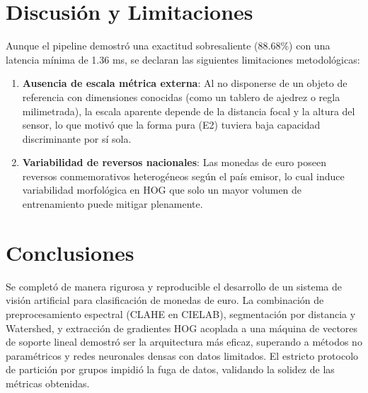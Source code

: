 \documentclass[journal,compsoc,twoside]{IEEEtran}
\begin{document}
\section{Discusión y Limitaciones}
Aunque el pipeline demostró una exactitud sobresaliente (88.68\%) con una latencia mínima de 1.36 ms, se declaran las siguientes limitaciones metodológicas:
\begin{enumerate}
    \item \textbf{Ausencia de escala métrica externa}: Al no disponerse de un objeto de referencia con dimensiones conocidas (como un tablero de ajedrez o regla milimetrada), la escala aparente depende de la distancia focal y la altura del sensor, lo que motivó que la forma pura (E2) tuviera baja capacidad discriminante por sí sola.
    \item \textbf{Variabilidad de reversos nacionales}: Las monedas de euro poseen reversos conmemorativos heterogéneos según el país emisor, lo cual induce variabilidad morfológica en HOG que solo un mayor volumen de entrenamiento puede mitigar plenamente.
\end{enumerate}

\section{Conclusiones}
Se completó de manera rigurosa y reproducible el desarrollo de un sistema de visión artificial para clasificación de monedas de euro. La combinación de preprocesamiento espectral (CLAHE en CIELAB), segmentación por distancia y Watershed, y extracción de gradientes HOG acoplada a una máquina de vectores de soporte lineal demostró ser la arquitectura más eficaz, superando a métodos no paramétricos y redes neuronales densas con datos limitados. El estricto protocolo de partición por grupos impidió la fuga de datos, validando la solidez de las métricas obtenidas.
\end{document}
